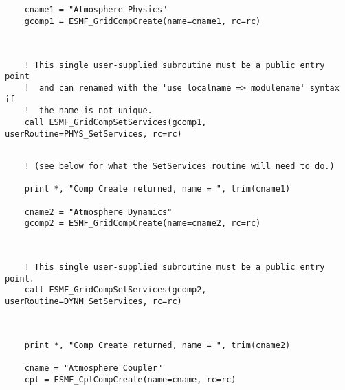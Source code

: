 
 \begin{verbatim}
    cname1 = "Atmosphere Physics"
    gcomp1 = ESMF_GridCompCreate(name=cname1, rc=rc)  
 
\end{verbatim}
 

 \begin{verbatim}

    ! This single user-supplied subroutine must be a public entry point 
    !  and can renamed with the 'use localname => modulename' syntax if
    !  the name is not unique.
    call ESMF_GridCompSetServices(gcomp1, userRoutine=PHYS_SetServices, rc=rc)
 
\end{verbatim}
 

 \begin{verbatim}
    ! (see below for what the SetServices routine will need to do.)

    print *, "Comp Create returned, name = ", trim(cname1)

    cname2 = "Atmosphere Dynamics"
    gcomp2 = ESMF_GridCompCreate(name=cname2, rc=rc)  
 
\end{verbatim}
 

 \begin{verbatim}

    ! This single user-supplied subroutine must be a public entry point.
    call ESMF_GridCompSetServices(gcomp2, userRoutine=DYNM_SetServices, rc=rc)
 
\end{verbatim}
 

 \begin{verbatim}

    print *, "Comp Create returned, name = ", trim(cname2)

    cname = "Atmosphere Coupler"
    cpl = ESMF_CplCompCreate(name=cname, rc=rc)
 
\end{verbatim}
 

